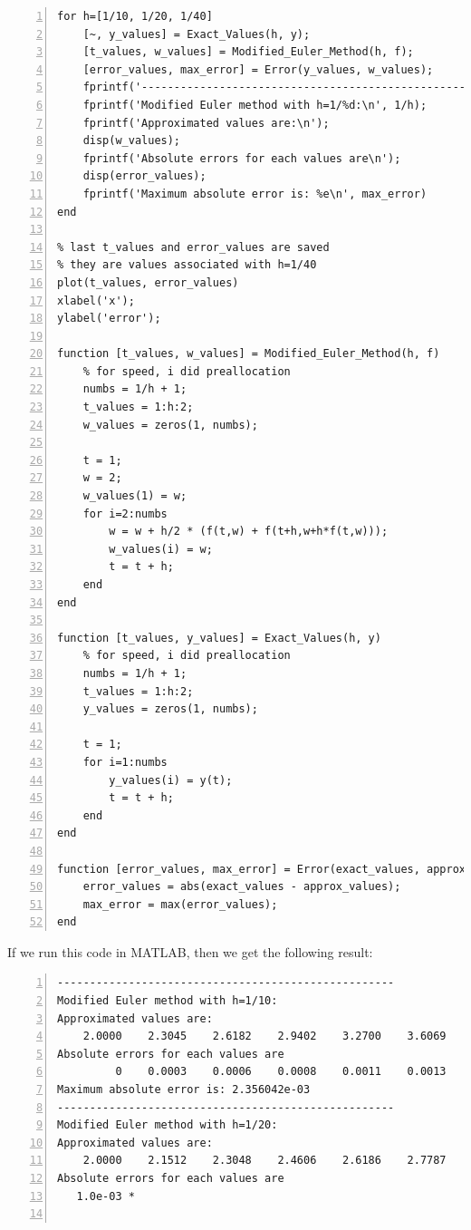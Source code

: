 \documentclass{article}
\begin{document}
\begin{enumerate}
\begin{lstlisting}[frame=single, numbers=left, style=Matlab-editor]
for h=[1/10, 1/20, 1/40]
    [~, y_values] = Exact_Values(h, y);
    [t_values, w_values] = Modified_Euler_Method(h, f);
    [error_values, max_error] = Error(y_values, w_values);
    fprintf('----------------------------------------------------\n');
    fprintf('Modified Euler method with h=1/%d:\n', 1/h);
    fprintf('Approximated values are:\n');
    disp(w_values);
    fprintf('Absolute errors for each values are\n');
    disp(error_values);
    fprintf('Maximum absolute error is: %e\n', max_error)
end

% last t_values and error_values are saved
% they are values associated with h=1/40
plot(t_values, error_values)
xlabel('x');
ylabel('error');

function [t_values, w_values] = Modified_Euler_Method(h, f)
    % for speed, i did preallocation
    numbs = 1/h + 1;
    t_values = 1:h:2;
    w_values = zeros(1, numbs);

    t = 1;
    w = 2;
    w_values(1) = w;
    for i=2:numbs
        w = w + h/2 * (f(t,w) + f(t+h,w+h*f(t,w)));
        w_values(i) = w;
        t = t + h;
    end
end

function [t_values, y_values] = Exact_Values(h, y)
    % for speed, i did preallocation
    numbs = 1/h + 1;
    t_values = 1:h:2;
    y_values = zeros(1, numbs);

    t = 1;
    for i=1:numbs
        y_values(i) = y(t);
        t = t + h;
    end
end

function [error_values, max_error] = Error(exact_values, approx_values)
    error_values = abs(exact_values - approx_values);
    max_error = max(error_values);
end
    \end{lstlisting} If we run this code in MATLAB, then we get the following result: \begin{lstlisting}[frame=single, numbers=left, style=Matlab-editor]
----------------------------------------------------
Modified Euler method with h=1/10:
Approximated values are:
    2.0000    2.3045    2.6182    2.9402    3.2700    3.6069    3.9505    4.3003    4.6561    5.0174    5.3839
Absolute errors for each values are
         0    0.0003    0.0006    0.0008    0.0011    0.0013    0.0015    0.0017    0.0020    0.0022    0.0024
Maximum absolute error is: 2.356042e-03
----------------------------------------------------
Modified Euler method with h=1/20:
Approximated values are:
    2.0000    2.1512    2.3048    2.4606    2.6186    2.7787    2.9409    3.1049    3.2708    3.4385    3.6079    3.7789    3.9516    4.1259    4.3016    4.4789    4.6575    4.8376    5.0190    5.2017    5.3857
Absolute errors for each values are
   1.0e-03 *


\end{lstlisting}
\end{enumerate}
\end{document}
